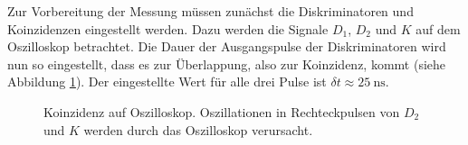 Zur Vorbereitung der Messung müssen zunächst die Diskriminatoren und Koinzidenzen eingestellt werden. Dazu werden die Signale $D_1$, $D_2$ und $K$ auf dem Oszilloskop betrachtet. Die Dauer der Ausgangspulse der Diskriminatoren wird nun so eingestellt, dass es zur Überlappung, also zur Koinzidenz, kommt (siehe Abbildung \ref{fig:signal_oszi}). Der eingestellte Wert für alle drei Pulse ist $\delta t \approx \SI{25}{\nano\second}$.

\begin{figure}[h]
  \centering
  \caption{Koinzidenz auf Oszilloskop. Oszillationen in Rechteckpulsen von $D_2$ und $K$ werden durch das Oszilloskop verursacht.}
  \label{fig:signal_oszi}
\end{figure}

